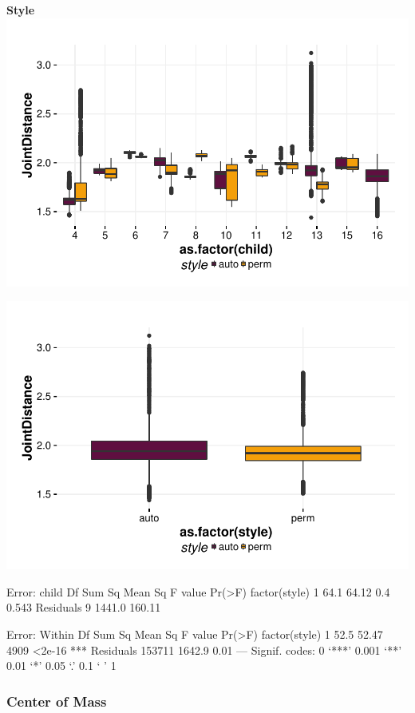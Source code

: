 \documentclass{article}
\begin{document}
\textbf{Style}
\includegraphics{features-plot_distance_child_style_quiz}

\includegraphics{features-plot_distance_style_quiz}

\begin{Schunk}
\begin{Soutput}
Error: child
              Df Sum Sq Mean Sq F value Pr(>F)
factor(style)  1   64.1   64.12     0.4  0.543
Residuals      9 1441.0  160.11               

Error: Within
                  Df Sum Sq Mean Sq F value Pr(>F)    
factor(style)      1   52.5   52.47    4909 <2e-16 ***
Residuals     153711 1642.9    0.01                   
---
Signif. codes:  0 ‘***’ 0.001 ‘**’ 0.01 ‘*’ 0.05 ‘.’ 0.1 ‘ ’ 1
\end{Soutput}
\end{Schunk}


\subsubsection{Center of Mass}
\end{document}
